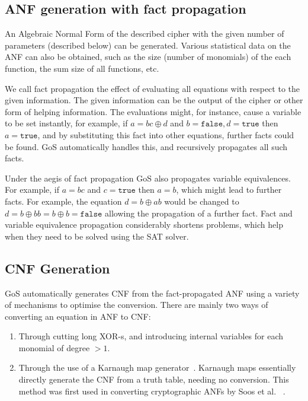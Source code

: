 \documentclass{llncs}
\begin{document}
\subsection{ANF generation with fact propagation}
An Algebraic Normal Form of the described cipher with the given number of parameters (described below) can be generated. Various statistical data on the ANF can also be obtained, such as the size (number of monomials) of the each function, the sum size of all functions, etc.

We call fact propagation the effect of evaluating all equations with respect to the given information. The given information can be the output of the cipher or other form of helping information. The evaluations might, for instance, cause a variable to be set instantly, for example, if $a = bc \oplus d$ and $b = \texttt{false}, d=\texttt{true}$ then $a = \texttt{true}$, and by substituting this fact into other equations, further facts could be found. GoS automatically handles this, and recursively propagates all such facts.

Under the aegis of fact propagation GoS also propagates variable equivalences. For example, if $a = bc$ and $c = \texttt{true}$ then $a = b$, which might lead to further facts. For example, the equation $d = b \oplus ab$ would be changed to $d = b \oplus bb = b \oplus b = \texttt{false}$ allowing the propagation of a further fact. Fact and variable equivalence propagation considerably shortens problems, which help when they need to be solved using the SAT solver.

\subsection{CNF Generation}
GoS automatically generates CNF from the fact-propagated ANF using a variety of mechanisms to optimise the conversion. There are mainly two ways of converting an equation in ANF to CNF:
\begin{enumerate}
  \item Through cutting long XOR-s, and introducing internal variables for each monomial of degree $>1$.

  \item Through the use of a Karnaugh map generator~\cite{Karnaugh53Logic}. Karnaugh maps essentially directly generate the CNF from a truth table, needing no conversion. This method was first used in converting cryptographic ANFs by Soos et al. ~\cite{DBLP:conf/sat/SoosNC09}.
\end{enumerate}
\end{document}
